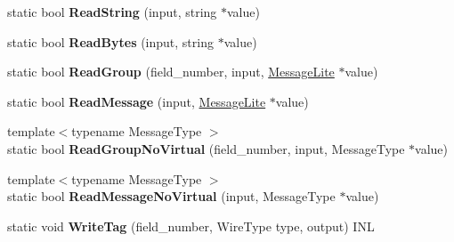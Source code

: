 \begin{DoxyCompactItemize}
\mbox{\label{classgoogle_1_1protobuf_1_1internal_1_1WireFormatLite_a361909342c353aeb0ec1ae21011c782d}} 
static bool {\bfseries Read\+String} (input, string $\ast$value)
\item 
\mbox{\label{classgoogle_1_1protobuf_1_1internal_1_1WireFormatLite_ac3a1b43bcd047a7cc1545015b6355458}} 
static bool {\bfseries Read\+Bytes} (input, string $\ast$value)
\item 
\mbox{\label{classgoogle_1_1protobuf_1_1internal_1_1WireFormatLite_a1bb59eccb61294feaf89548ce79eaedb}} 
static bool {\bfseries Read\+Group} (field\+\_\+number, input, \hyperlink{classgoogle_1_1protobuf_1_1MessageLite}{Message\+Lite} $\ast$value)
\item 
\mbox{\label{classgoogle_1_1protobuf_1_1internal_1_1WireFormatLite_a1497cefd585e58a16085b601aec64799}} 
static bool {\bfseries Read\+Message} (input, \hyperlink{classgoogle_1_1protobuf_1_1MessageLite}{Message\+Lite} $\ast$value)
\item 
\mbox{\label{classgoogle_1_1protobuf_1_1internal_1_1WireFormatLite_aec6941a8ac095e8f91480ee801edc487}} 
{\footnotesize template$<$typename Message\+Type $>$ }\\static bool {\bfseries Read\+Group\+No\+Virtual} (field\+\_\+number, input, Message\+Type $\ast$value)
\item 
\mbox{\label{classgoogle_1_1protobuf_1_1internal_1_1WireFormatLite_a37b58a9b4cd56806106bdeffe647340e}} 
{\footnotesize template$<$typename Message\+Type $>$ }\\static bool {\bfseries Read\+Message\+No\+Virtual} (input, Message\+Type $\ast$value)
\item 
\mbox{\label{classgoogle_1_1protobuf_1_1internal_1_1WireFormatLite_a213c9236ebd73d84441a0db5688ee744}} 
static void {\bfseries Write\+Tag} (field\+\_\+number, Wire\+Type type, output) I\+NL
\item 

\end{DoxyCompactItemize}

